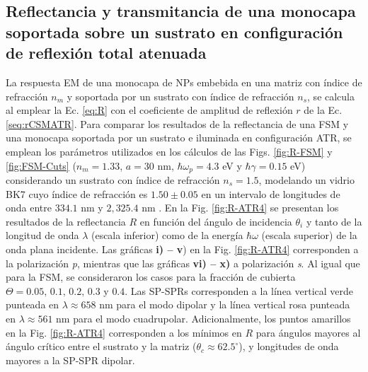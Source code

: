 	\subsection{Reflectancia y transmitancia de una monocapa soportada sobre un sustrato en configuración de reflexión total atenuada}
	\label{ssection:DrudeATR}

La respuesta EM de una monocapa de NPs embebida en una matriz con índice de refracción $n_m$ y soportada por un sustrato con índice de refracción $n_s$, se calcula al emplear la Ec.  \eqref{eq:R} con el coeficiente de amplitud de reflexión $r$ de la Ec.  \eqref{seq:rCSMATR}. Para comparar los resultados de la reflectancia de una FSM y una monocapa soportada por un sustrato e iluminada en configuración ATR, se emplean los parámetros utilizados en los cálculos de las Figs. \ref{fig:R-FSM} y \ref{fig:FSM-Cuts} ($n_m=1.33$, $a=30$ nm, $\hbar\omega_p=4.3$ eV y  $\hbar\gamma = 0.15$ eV) considerando un sustrato con índice de refracción $n_s=1.5$, modelando un vidrio BK7 cuyo índice de refracción es $1.50\pm 0.05$ en un intervalo de longitudes de onda entre $334.1$ nm y $2,325.4$ nm \cite{schott2019datasheet}. En la Fig.  \ref{fig:R-ATR4} se presentan los resultados de la reflectancia $R$ en función del ángulo de incidencia $\theta_i$ y tanto de la longitud de onda $\lambda$ (escala inferior) como de la energía $\hbar\omega$ (escala superior)  de la onda plana incidente. Las gráficas \textbf{i) -- v}) en la Fig. \ref{fig:R-ATR4}  corresponden a la polarización \emph{p}, mientras que las gráficas \textbf{vi) -- x)} a polarización \emph{s}. Al igual que para la FSM, se consideraron los casos para la fracción de cubierta $\Theta = 0.05,\,0.1,\,0.2,\,0.3$ y $0.4$. Las SP-SPRs corresponden a la línea vertical verde punteada en $\lambda \approx 658$ nm para el modo dipolar y la línea vertical rosa punteada en  $\lambda \approx 561$ nm para el modo cuadrupolar. Adicionalmente, los puntos amarillos en la Fig. \ref{fig:R-ATR4} corresponden a los mínimos en $R$ para ángulos mayores al ángulo crítico entre el sustrato y la matriz ($\theta_c\approx 62.5^\circ$), y longitudes de onda mayores a la SP-SPR dipolar.

